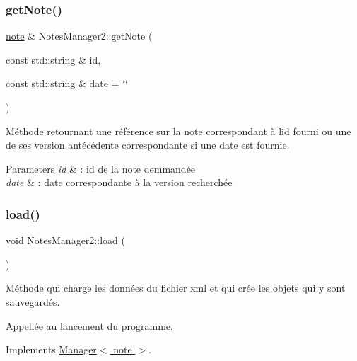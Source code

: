 \subsubsection{\texorpdfstring{get\+Note()}{getNote()}}
{\footnotesize\ttfamily \hyperlink{classnote}{note} \& Notes\+Manager2\+::get\+Note (\begin{DoxyParamCaption}\item[{const std\+::string \&}]{id,  }\item[{const std\+::string \&}]{date = {\ttfamily \char`\"{}\char`\"{}} }\end{DoxyParamCaption})}



Méthode retournant une référence sur la note correspondant à l\textquotesingle{}id fourni ou une de ses version antécédente correspondante si une date est fournie. 


\begin{DoxyParams}{Parameters}
{\em id} & \+: id de la note demmandée \\
\hline
{\em date} & \+: date correspondante à la version recherchée \\
\hline
\end{DoxyParams}
\mbox{\label{class_notes_manager2_a2248b5b1620b2039fdba9b3c6476c6cc}} 
\subsubsection{\texorpdfstring{load()}{load()}}
{\footnotesize\ttfamily void Notes\+Manager2\+::load (\begin{DoxyParamCaption}{ }\end{DoxyParamCaption})\hspace{0.3cm}{\ttfamily [virtual]}}



Méthode qui charge les données du fichier xml et qui crée les objets qui y sont sauvegardés. 

Appellée au lancement du programme. 

Implements \hyperlink{class_manager_add6a6361b3ebef4e6e744c2b12f9e57d}{Manager$<$ note $>$}.

\mbox{\label{class_notes_manager2_a03224a8a150d7d7a40a6633ab2afc7c0}} 
